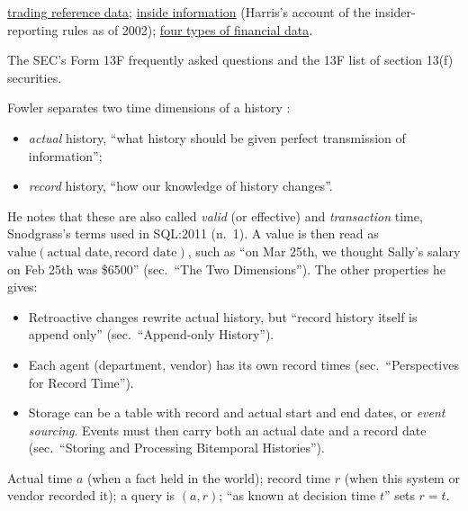 \begin{qfdata}
 \hyperref[data:trading-reference-data]{trading reference data}; \hyperref[def:inside-information]{inside information} (Harris's account of the insider-reporting rules as of 2002); \hyperref[def:financial-data-types]{four types of financial data}.

 The SEC's Form 13F frequently asked questions and the 13F list of section 13(f) securities.

\end{qfdata}

\begin{qfmethod}\label{meth:bitemporal-reference-tables}
 Fowler separates two time dimensions of a history \citep[sec.~``The Two Dimensions'']{s8-bitemporal}:
\begin{itemize}
\item \emph{actual} history, ``what history should be given perfect transmission of information'';
\item \emph{record} history, ``how our knowledge of history changes''.
\end{itemize}
He notes that these are also called \emph{valid} (or effective) and \emph{transaction} time, Snodgrass's terms used in SQL:2011 (n.~1). A value is then read as $\text{value}(\text{actual date},\text{record date})$, such as ``on Mar 25th, we thought Sally's salary on Feb 25th was \$6500'' (sec.~``The Two Dimensions''). The other properties he gives:
\begin{itemize}
\item Retroactive changes rewrite actual history, but ``record history itself is append only'' (sec.~``Append-only History'').
\item Each agent (department, vendor) has its own record times (sec.~``Perspectives for Record Time'').
\item Storage can be a table with record and actual start and end dates, or \emph{event sourcing}. Events must then carry both an actual date and a record date (sec.~``Storing and Processing Bitemporal Histories'').
\end{itemize}

 Actual time $a$ (when a fact held in the world); record time $r$ (when this system or vendor recorded it); a query is $(a,r)$; ``as known at decision time $t$'' sets $r=t$.


\end{qfmethod}
